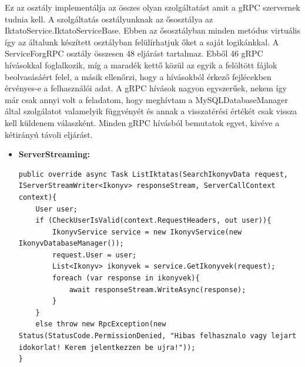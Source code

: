 \documentclass[
]{thesis-ekf}
\theoremstyle{definition}
\theoremstyle{remark}
\begin{document}
Ez az osztály implementálja az összes olyan szolgáltatást amit a gRPC szervernek tudnia kell. A szolgáltatás osztályunknak az ősosztálya az IktatoService.IktatoServiceBase. Ebben az ősosztályban minden metódus virtuális így az általunk készített osztályban felülírhatjuk őket a saját logikánkkal. A ServiceForgRPC osztály összesen 48 eljárást tartalmaz. Ebből 46 gRPC hívásokkal foglalkozik, míg a maradék kettő közül az egyik a felöltött fájlok beolvasásáért felel, a másik ellenőrzi, hogy a hívásokból érkező fejlécekben érvényes-e a felhasználói adat. A gRPC hívások nagyon egyszerűek, nekem így már csak annyi volt a feladatom, hogy meghívtam a MySQLDatabaseManager által szolgálatot valamelyik függvényét és annak a visszatérési értékét csak vissza kell küldenem válaszként. Minden gRPC hívásból bemutatok egyet, kivéve a kétirányú távoli eljárást.
\begin{itemize}[leftmargin=0pt]
	\item \textbf{ServerStreaming: }
	\begin{lstlisting}[showstringspaces=false,caption={Iktatások küldése a kliens számára.},captionpos=b]
public override async Task ListIktatas(SearchIkonyvData request, IServerStreamWriter<Ikonyv> responseStream, ServerCallContext context){
	User user;
	if (CheckUserIsValid(context.RequestHeaders, out user)){
		IkonyvService service = new IkonyvService(new IkonyvDatabaseManager());
		request.User = user;
		List<Ikonyv> ikonyvek = service.GetIkonyvek(request);
		foreach (var response in ikonyvek){
			await responseStream.WriteAsync(response);
		}
	}
	else throw new RpcException(new Status(StatusCode.PermissionDenied, "Hibas felhasznalo vagy lejart idokorlat! Kerem jelentkezzen be ujra!"));
} 


\end{lstlisting}
\end{itemize}
\end{document}
